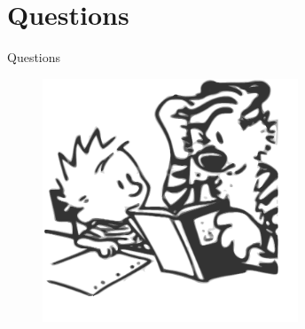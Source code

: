 \documentclass[style=horatio,mode=present,paper=screen]{powerdot}
\begin{document}
\section[slide=false]{Questions}
\begin{slide}[toc=,bm=]{Questions}
\begin{figure}
\includegraphics[width=3in]{figures/calvin_and_hobbes}
\end{figure}
\end{slide}
\end{document}
